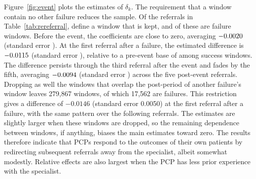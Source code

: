 \documentclass[12pt]{article}
\newcommand{\rereferESEventsSutva}{279,867}
\newcommand{\rereferESFailuresSutva}{17,562}
\newcommand{\rereferESFirstSutva}{-0.0146}
\newcommand{\rereferESFirstSESutva}{0.0050}
\begin{document}
Figure~\ref{fig:event} plots the estimates of $\delta_k$. The requirement that a window contain no other failure reduces the sample. Of the \rereferEvents{} referrals in Table~\ref{tab:rereferral}, \rereferESEvents{} define a window that is kept, and \rereferESFailures{} of these are failure windows. Before the event, the coefficients are close to zero, averaging $-0.0020{}$ (standard error \rereferESPreSE{}). At the first referral after a failure, the estimated difference is $-0.0115{}$ (standard error \rereferESFirstSE{}), relative to a pre-event base of \rereferESBase{} among success windows. The difference persists through the third referral after the event and fades by the fifth, averaging $-0.0094{}$ (standard error \rereferESPostSE{}) across the five post-event referrals. Dropping as well the windows that overlap the post-period of another failure's window leaves \rereferESEventsSutva{} windows, of which \rereferESFailuresSutva{} are failures. This restriction gives a difference of $\rereferESFirstSutva{}$ (standard error \rereferESFirstSESutva{}) at the first referral after a failure, with the same pattern over the following referrals. The estimates are slightly larger when these windows are dropped, so the remaining dependence between windows, if anything, biases the main estimates toward zero. The results therefore indicate that PCPs respond to the outcomes of their own patients by redirecting subsequent referrals away from the specialist, albeit somewhat modestly. Relative effects are also largest when the PCP has less prior experience with the specialist.
\end{document}
